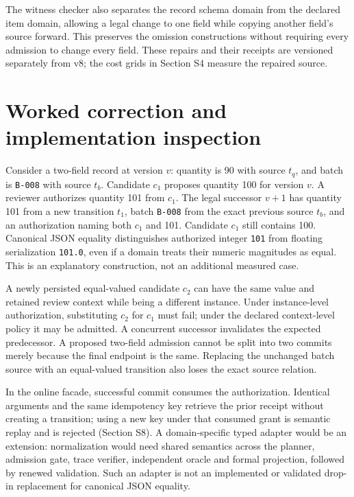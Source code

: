 \documentclass[11pt,a4paper]{article}
\newcommand{\code}[1]{\nolinkurl{#1}}
\begin{document}
The witness checker also separates the record schema domain from the declared item domain, allowing a legal change to one field while copying another field's source forward. This preserves the omission constructions without requiring every admission to change every field. These repairs and their receipts are versioned separately from v8; the cost grids in Section S4 measure the repaired source.

\section{Worked correction and implementation inspection}
\label{app:worked-example}

Consider a two-field record at version $v$: quantity is 90 with source $t_q$, and batch is \code{B-008} with source $t_b$. Candidate $c_1$ proposes quantity 100 for version $v$. A reviewer authorizes quantity 101 from $c_1$. The legal successor $v+1$ has quantity 101 from a new transition $t_1$, batch \code{B-008} from the exact previous source $t_b$, and an authorization naming both $c_1$ and 101. Candidate $c_1$ still contains 100. Canonical JSON equality distinguishes authorized integer \code{101} from floating serialization \code{101.0}, even if a domain treats their numeric magnitudes as equal. This is an explanatory construction, not an additional measured case.

A newly persisted equal-valued candidate $c_2$ can have the same value and retained review context while being a different instance. Under instance-level authorization, substituting $c_2$ for $c_1$ must fail; under the declared context-level policy it may be admitted. A concurrent successor invalidates the expected predecessor. A proposed two-field admission cannot be split into two commits merely because the final endpoint is the same. Replacing the unchanged batch source with an equal-valued transition also loses the exact source relation.

In the online facade, successful commit consumes the authorization. Identical arguments and the same idempotency key retrieve the prior receipt without creating a transition; using a new key under that consumed grant is semantic replay and is rejected (Section S8). A domain-specific typed adapter would be an extension: normalization would need shared semantics across the planner, admission gate, trace verifier, independent oracle and formal projection, followed by renewed validation. Such an adapter is not an implemented or validated drop-in replacement for canonical JSON equality.
\end{document}
